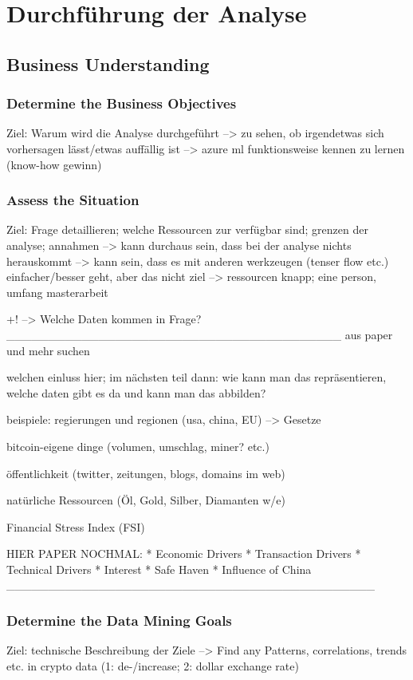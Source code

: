 \chapter{Durchführung der Analyse}


\section{Business Understanding}
\subsection{Determine the Business Objectives}
Ziel: Warum wird die Analyse durchgeführt
--> zu sehen, ob irgendetwas sich vorhersagen lässt/etwas auffällig ist 
--> azure ml funktionsweise kennen zu lernen (know-how gewinn)

\subsection{Assess the Situation}
Ziel: Frage detaillieren; welche Ressourcen zur verfügbar sind; grenzen der analyse; annahmen
--> kann durchaus sein, dass bei der analyse nichts herauskommt
--> kann sein, dass es mit anderen werkzeugen (tenser flow etc.) einfacher/besser geht, aber das nicht ziel
--> ressourcen knapp; eine person, umfang masterarbeit

+! --> Welche Daten kommen in Frage?
________________________________________
aus paper und mehr suchen

welchen einluss hier; im nächsten teil dann:
wie kann man das repräsentieren, welche daten gibt es da und kann man das abbilden?

beispiele:
regierungen und regionen (usa, china, EU) --> Gesetze

bitcoin-eigene dinge (volumen, umschlag, miner? etc.)

öffentlichkeit (twitter, zeitungen, blogs, domains im web)

natürliche Ressourcen (Öl, Gold, Silber, Diamanten w/e)

Financial Stress Index (FSI)


HIER PAPER NOCHMAL:
* Economic Drivers
* Transaction Drivers
* Technical Drivers
* Interest
* Safe Haven
* Influence of China
____________________________________________

\subsection{Determine the Data Mining Goals}
Ziel: technische Beschreibung der Ziele
--> Find any Patterns, correlations, trends etc. in crypto data (1: de-/increase; 2: dollar exchange rate)

